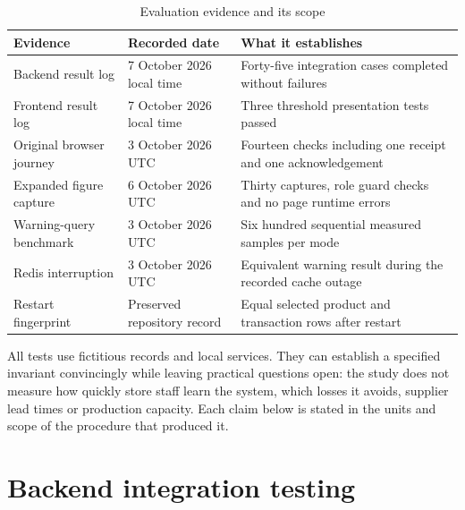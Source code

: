 \begin{table}[htbp]\centering\small{}\setlength{\tabcolsep}{3pt}\renewcommand{\arraystretch}{1.25}
\caption{Evaluation evidence and its scope}\label{tab:evidence-dates}
\begin{tabular}{>{\raggedright\arraybackslash}p{}>{\raggedright\arraybackslash}p{}>{\raggedright\arraybackslash}p{}}
\toprule
\textbf{Evidence} & \textbf{Recorded date} & \textbf{What it establishes} \\
\midrule
\leavevmode{}Backend result log & \leavevmode{}7 October 2026 local time & \leavevmode{}Forty-five integration cases completed without failures \\
\leavevmode{}Frontend result log & \leavevmode{}7 October 2026 local time & \leavevmode{}Three threshold presentation tests passed \\
\leavevmode{}Original browser journey & \leavevmode{}3 October 2026 UTC & \leavevmode{}Fourteen checks including one receipt and one acknowledgement \\
\leavevmode{}Expanded figure capture & \leavevmode{}6 October 2026 UTC & \leavevmode{}Thirty captures, role guard checks and no page runtime errors \\
\leavevmode{}Warning-query benchmark & \leavevmode{}3 October 2026 UTC & \leavevmode{}Six hundred sequential measured samples per mode \\
\leavevmode{}Redis interruption & \leavevmode{}3 October 2026 UTC & \leavevmode{}Equivalent warning result during the recorded cache outage \\
\leavevmode{}Restart fingerprint & \leavevmode{}Preserved repository record & \leavevmode{}Equal selected product and transaction rows after restart \\
\bottomrule\end{tabular}\end{table}

All tests use fictitious records and local services. They can establish a specified invariant convincingly while leaving practical questions open: the study does not measure how quickly store staff learn the system, which losses it avoids, supplier lead times or production capacity. Each claim below is stated in the units and scope of the procedure that produced it.


\FloatBarrier

\section{Backend integration testing}


